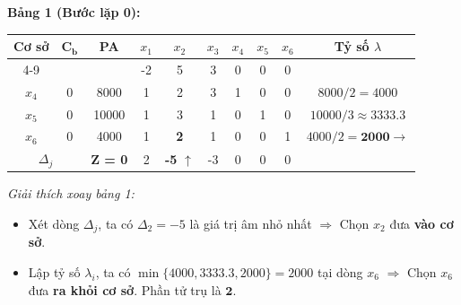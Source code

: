 \textbf{Bảng 1 (Bước lặp 0):}
\begin{table}[H]
    \centering
    \renewcommand{\arraystretch}{1.3}
    \begin{tabular}{|c|c|c|c|c|c|c|c|c|c|}
        \hline
        \multirow{2}{*}{\textbf{Cơ sở}} & \multirow{2}{*}{$\mathbf{C_b}$} & \multirow{2}{*}{\textbf{PA}} & $x_1$ & $x_2$ & $x_3$ & $x_4$ & $x_5$ & $x_6$ & \multirow{2}{*}{\textbf{Tỷ số $\lambda$}} \\
        \cline{4-9}
        & & & -2 & 5 & 3 & 0 & 0 & 0 & \\
        \hline
        $x_4$ & 0 & 8000 & 1 & 2 & 3 & 1 & 0 & 0 & $8000/2 = 4000$ \\
        \hline
        $x_5$ & 0 & 10000 & 1 & 3 & 1 & 0 & 1 & 0 & $10000/3 \approx 3333.3$ \\
        \hline
        $x_6$ & 0 & 4000 & 1 & \textbf{2} & 1 & 0 & 0 & 1 & $4000/2 = \mathbf{2000} \rightarrow$ \\
        \hline
        \multicolumn{2}{|c|}{$\Delta_j$} & \textbf{Z = 0} & 2 & \textbf{-5} $\uparrow$ & -3 & 0 & 0 & 0 & \\
        \hline
    \end{tabular}
\end{table}
\textit{Giải thích xoay bảng 1:}
\begin{itemize}[itemsep=0pt, parsep=0pt, topsep=0pt]
    \item Xét dòng $\Delta_j$, ta có $\Delta_2 = -5$ là giá trị âm nhỏ nhất $\Rightarrow$ Chọn $x_2$ đưa \textbf{vào cơ sở}.
    \item Lập tỷ số $\lambda_i$, ta có $\min\{4000, 3333.3, 2000\} = 2000$ tại dòng $x_6$ $\Rightarrow$ Chọn $x_6$ đưa \textbf{ra khỏi cơ sở}. Phần tử trụ là $\mathbf{2}$.
\end{itemize}

